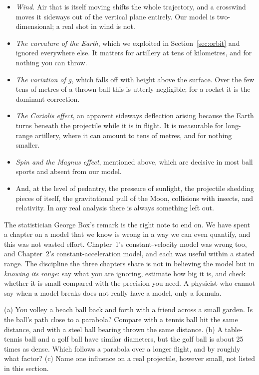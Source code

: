 \documentclass[11pt,twoside,openany]{book}
\newcounter{check}[chapter]
\begin{document}
\begin{itemize}[itemsep=3pt]
  \item \emph{Wind.} Air that is itself moving shifts the whole trajectory, and a crosswind moves it sideways out of the vertical plane entirely. Our model is two-dimensional; a real shot in wind is not.
  \item \emph{The curvature of the Earth}, which we exploited in Section~\ref{sec:orbit} and ignored everywhere else. It matters for artillery at tens of kilometres, and for nothing you can throw.
  \item \emph{The variation of $g$}, which falls off with height above the surface. Over the few tens of metres of a thrown ball this is utterly negligible; for a rocket it is the dominant correction.
  \item \emph{The Coriolis effect}, an apparent sideways deflection arising because the Earth turns beneath the projectile while it is in flight. It is measurable for long-range artillery, where it can amount to tens of metres, and for nothing smaller.
  \item \emph{Spin and the Magnus effect}, mentioned above, which are decisive in most ball sports and absent from our model.
  \item And, at the level of pedantry, the pressure of sunlight, the projectile shedding pieces of itself, the gravitational pull of the Moon, collisions with insects, and relativity. In any real analysis there is always something left out.
\end{itemize}

\begin{modelnote}
The statistician George Box's remark is the right note to end on. We have spent a chapter on a model that we know is wrong in a way we can even quantify, and this was not wasted effort. Chapter~1's constant-velocity model was wrong too, and Chapter~2's constant-acceleration model, and each was useful within a stated range. The discipline the three chapters share is not in believing the model but in \emph{knowing its range}: say what you are ignoring, estimate how big it is, and check whether it is small compared with the precision you need. A physicist who cannot say when a model breaks does not really have a model, only a formula.
\end{modelnote}

\begin{checkbox}
(a) You volley a beach ball back and forth with a friend across a small garden. Is the ball's path close to a parabola? Compare with a tennis ball hit the same distance, and with a steel ball bearing thrown the same distance. (b) A table-tennis ball and a golf ball have similar diameters, but the golf ball is about \num{25} times as dense. Which follows a parabola over a longer flight, and by roughly what factor? (c) Name one influence on a real projectile, however small, not listed in this section.
\end{checkbox}
\end{document}
